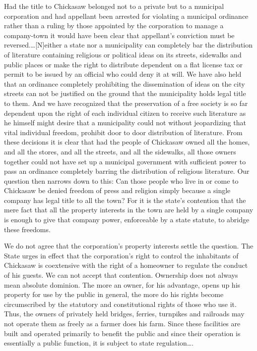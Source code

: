 Had the title to Chickasaw belonged not to a private but to a municipal
corporation and had appellant been arrested for violating a municipal ordinance
rather than a ruling by those appointed by the corporation to manage a
company-town it would have been clear that appellant's conviction must be
reversed.\ldots[N]either a state nor a municipality can completely bar the
distribution of literature containing religious or political ideas on its
streets, sidewalks and public places or make the right to distribute dependent
on a flat license tax or permit to be issued by an official who could deny it
at will. We have also held that an ordinance completely prohibiting the
dissemination of ideas on the city streets can not be justified on the ground
that the municipality holds legal title to them. And we have recognized that
the preservation of a free society is so far dependent upon the right of each
individual citizen to receive such literature as he himself might desire that a
municipality could not without jeopardizing that vital individual freedom,
prohibit door to door distribution of literature. From these decisions it is
clear that had the people of Chickasaw owned all the homes, and all the stores,
and all the streets, and all the sidewalks, all those owners together could not
have set up a municipal government with sufficient power to pass an ordinance
completely barring the distribution of religious literature.  Our question then
narrows down to this: Can those people who live in or come to Chickasaw be
denied freedom of press and religion simply because a single company has legal
title to all the town?   For it is the state's contention that the mere fact
that all the property interests in the town are held by a single company is
enough to give that company power, enforceable by a state statute, to abridge
these freedoms.

We do not agree that the corporation's property interests settle the question.
The State urges in effect that the corporation's right to control the
inhabitants of Chickasaw is coextensive with the right of a homeowner to
regulate the conduct of his guests. We can not accept that contention.
Ownership does not always mean absolute dominion. The more an owner, for his
advantage, opens up his property for use by the public in general, the more do
his rights become circumscribed by the statutory and constitutional rights of
those who use it. Thus, the owners of privately held bridges, ferries,
turnpikes and railroads may not operate them as freely as a farmer does his
farm. Since these facilities are built and operated primarily to benefit the
public and since their operation is essentially a public function, it is
subject to state regulation\ldots.

